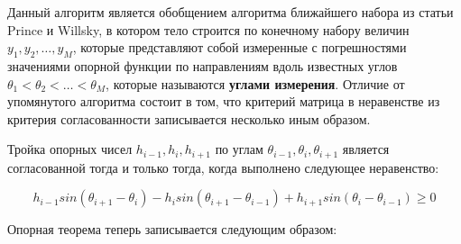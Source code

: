 \documentclass[a4paper, 12pt, titlepage]{article}
\theoremstyle{definition}
\theoremstyle{plain}
\theoremstyle{plain}
\begin{document}
Данный алгоритм является обобщением алгоритма ближайшего набора из статьи Prince
и Willsky, в котором тело строится по конечному набору величин
$y_{1}, y_{2}, \ldots, y_{M}$,  которые представляют собой измеренные с
погрешностями значениями опорной функции по направлениям вдоль известных углов
$\theta_{1} < \theta_{2} < \ldots < \theta_{M}$, которые называются
\textbf{углами измерения}. Отличие от упомянутого алгоритма состоит в том, что
критерий матрица в неравенстве из критерия согласованности записывается
несколько иным образом.

Тройка опорных чисел $h_{i - 1}, h_{i}, h_{i + 1}$ по углам $\theta_{i - 1},
\theta_{i}, \theta_{i + 1}$ является согласованной тогда и только тогда, когда
выполнено следующее неравенство:

\begin{equation}
h_{i - 1} sin(\theta_{i + 1} - \theta_{i}) -
h_{i} sin(\theta_{i + 1} - \theta_{i - 1}) +
h_{i + 1} sin(\theta_{i} - \theta_{i - 1}) \geq 0
\end{equation}

Опорная теорема теперь записывается следующим образом:
\end{document}
